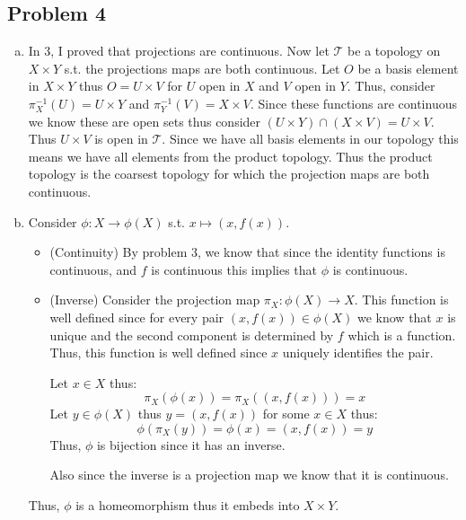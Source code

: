\documentclass[12pt, letterpaper]{article}
\theoremstyle{definition}
\newcommand{\T}{\mathcal{T}}
\begin{document}
\subsection*{Problem 4}
\begin{enumerate}[(a)]
    \item In 3, I proved that projections are continuous. Now let $\T$ be a topology on $X \times Y$ s.t. the projections maps are both continuous. Let $O$ be a basis element in $X \times Y$ thus $O=U \times V$ for $U$ open in $X$ and $V$ open in $Y$.
    Thus, consider $\pi_X^{-1}(U)=U \times Y$ and $\pi_Y^{-1}(V) = X \times V$. Since these functions are continuous we know these are open sets thus consider $(U \times Y) \cap (X \times V)=U \times V$. Thus $U \times V$ is open in $\T$. Since we have all basis elements in our topology this means we have all elements from the product topology. Thus the product topology is the coarsest topology for which the projection maps are both continuous.

    \item Consider $\phi :X \to \phi(X)$ s.t. $x \mapsto (x,f(x))$.
    \begin{itemize}
        \item (Continuity) By problem 3, we know that since the identity functions is continuous, and $f$ is continuous this implies that $\phi$ is continuous.
        \item (Inverse) Consider the projection map $\pi_X : \phi(X) \to X$. This function is well defined since for every pair $(x,f(x)) \in \phi(X)$ we know that $x$ is unique and the second component is determined by $f$ which is a function. Thus, this function is well defined since $x$ uniquely identifies the pair.
        
        Let $x \in X$ thus:
        \[\pi_X(\phi(x))=\pi_X((x,f(x)))=x\]
        Let $y \in \phi(X)$ thus $y=(x,f(x))$ for some $x \in X$ thus:
        \[\phi(\pi_X(y))=\phi(x)=(x,f(x))=y\]
        Thus, $\phi$ is bijection since it has an inverse.
        
        Also since the inverse is a projection map we know that it is continuous.
    \end{itemize}
    Thus, $\phi$ is a homeomorphism thus it embeds into $X \times Y$.
\end{enumerate}

\newpage
\end{document}
